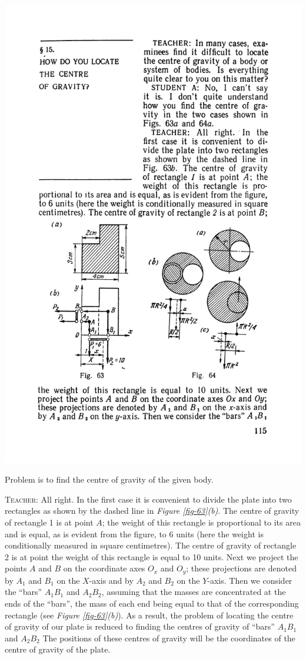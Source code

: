 \documentclass[a4paper,sfsidenotes]{tufte-book}
\begin{document}
\begin{marginfigure}[3cm]
\centering
\includegraphics[width=0.8\linewidth]{fig-063a.pdf}
\caption{Problem is to find the centre of gravity of the given body.}
\label{fig-63}
\end{marginfigure}

\textsc{Teacher:} All right. In the first case it is convenient to divide the plate into two rectangles as shown by the dashed line in \emph{Figure \ref{fig-63}(b)}. The centre of gravity of rectangle 1 is at point $A$; the weight of this rectangle is proportional to its area and is equal, as is evident from the figure, to 6 units (here the weight is conditionally measured in square centimetres). The centre of gravity of rectangle 2 is at point the weight of this rectangle is equal to 10 units. Next we project the points $A$ and $B$ on the coordinate axes $O_{x}$ and $O_{y}$; these projections are denoted by $A_{1}$ and $B_{1}$ on the $X$-axis and by $A_{2}$ and $B_{2}$ on the $Y$-axis. Then we consider the ``bars'' $A_{1}B_{1}$ and $A_{2}B_{2}$, assuming that the masses are concentrated at the ends of the ``bars'', the mass of each end being equal to that of the corresponding rectangle (see \emph{Figure \ref{fig-63}(b)}). As a result, the problem of locating the centre of gravity of our plate is reduced to finding the centres of gravity of ``bars'' $A_{1}B_{1}$ and $A_{2}B_{2}$ The positions of these centres of gravity will be the coordinates of the centre of gravity of the plate.
\end{document}
